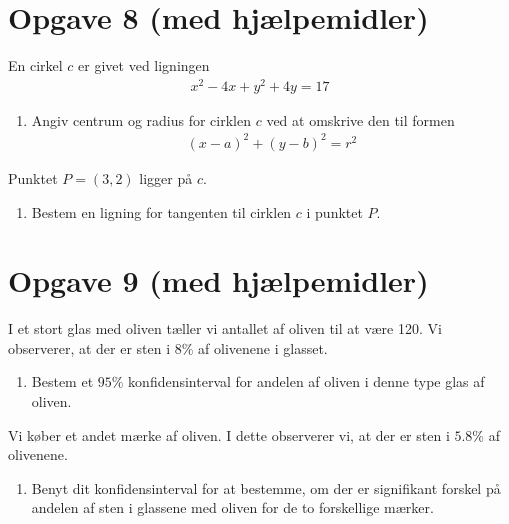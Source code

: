 \documentclass[12pt]{article}
\begin{document}
\section*{Opgave 8 (med hjælpemidler)}
En cirkel $c$ er givet ved ligningen 
\begin{align*}
x^2-4x+y^2+4y = 17
\end{align*}
\begin{enumerate}[label=\roman*)]
\item Angiv centrum og radius for cirklen $c$ ved at omskrive den til formen
\begin{align*}
(x-a)^2+(y-b)^2 = r^2
\end{align*}
\end{enumerate}
Punktet $P = (3,2)$ ligger på $c$. 
\begin{enumerate}[label=\roman*)]
\item Bestem en ligning for tangenten til cirklen $c$ i punktet $P$.
\end{enumerate}

\section*{Opgave 9 (med hjælpemidler)}
I et stort glas med oliven tæller vi antallet af oliven til at være 120. Vi observerer, at der er sten i $8\%$ af olivenene i glasset. 
\begin{enumerate}[label=\roman*)]
\item Bestem et $95\%$ konfidensinterval for andelen af oliven i denne type glas af oliven. 
\end{enumerate}
Vi køber et andet mærke af oliven. I dette observerer vi, at der er sten i $5.8\%$ af olivenene. 
\begin{enumerate}[label=\roman*)]
\item Benyt dit konfidensinterval for at bestemme, om der er signifikant forskel på andelen af sten i glassene med oliven for de to forskellige mærker. 
\end{enumerate} 
\end{document}

